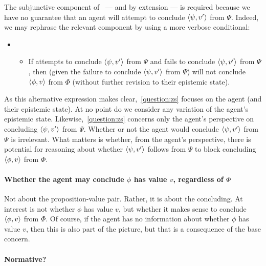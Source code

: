 \begin{note}
  The subjunctive component of~\zs{} --- and by extension \qzs{} --- is required because we have no guarantee that an agent will attempt to conclude \(\langle \psi, v' \rangle\) from \(\Psi\).
  Indeed, we may rephrase the relevant component by using a more verbose conditional:

  \begin{itemize}
  \item[]
    \begin{itemize}
    \item
      If \vAgent{} attempts to conclude \(\langle \psi, v' \rangle\) from \(\Psi\) and fails to conclude \(\langle \psi, v' \rangle\) from \(\Psi\), then (given the failure to conclude  \(\langle \psi, v' \rangle\) from \(\Psi\)) \vAgent{} will not conclude \(\langle \phi, v \rangle\) from \(\Phi\) (without further revision to their epistemic state).
    \end{itemize}
  \end{itemize}

  As this alternative expression makes clear,~\autoref{question:zs} focuses on the agent (and their epistemic state).
  At no point do we consider any variation of the agent's epistemic state.
  Likewise,~\autoref{question:zs} concerns only the agent's perspective on concluding \(\langle \psi, v' \rangle\) from \(\Psi\).
  Whether or not the agent would conclude \(\langle \psi, v' \rangle\) from \(\Psi\) is irrelevant.
  What matters is whether, from the agent's perspective, there is potential for reasoning about whether \(\langle \psi, v' \rangle\) follows from \(\Psi\) to block concluding \(\langle \phi, v \rangle\) from \(\Phi\).
\end{note}

\paragraph*{Whether the agent may conclude \(\phi\) has value \(v\), regardless of \(\Phi\)}

\begin{note}
  Not about the proposition-value pair.
  Rather, it is about the concluding.
  At interest is not whether \(\phi\) has value \(v\), but whether it makes sense to conclude \(\langle \phi, v \rangle\) from \(\Phi\).
  Of course, if the agent has no information about whether \(\phi\) has value \(v\), then this is also part of the picture, but that is a consequence of the base concern.
\end{note}

\paragraph*{Normative?}

